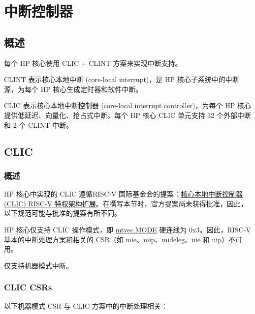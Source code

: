 \documentclass[main\_\_CN.tex]{subfiles}
\begin{document}
\newpage
\section{中断控制器}
\label{sec:riscvcpu-int-ctrl}


\subsection{概述}
\label{sec:riscvcpu-intr-overview}

每个 HP 核心使用 CLIC + CLINT 方案来实现中断支持。

CLINT 表示核心本地中断 (core-local interrupt)，是 HP 核心子系统中的中断源，为每个 HP 核心生成定时器和软件中断。

CLIC 表示核心本地中断控制器 (core-local interrupt controller)，为每个 HP 核心提供低延迟、向量化、抢占式中断。每个 HP 核心 CLIC 单元支持 32 个外部中断和 2 个 CLINT 中断。


\subsection{CLIC}
\label{sec:riscvcpu-clic}

\subsubsection{概述}
\label{sec:riscvcpu-clic-overview}


HP 核心中实现的 CLIC 遵循RISC-V 国际基金会的提案：\href{https://github.com/riscv/riscv-fast-interrupt/blob/26d29ce6ab7f1def8e5dc0a41639a1d8f67ea339/clic.adoc}{核心本地中断控制器 (CLIC) RISC-V 特权架构扩展}。在撰写本节时，官方提案尚未获得批准，因此，以下规范可能与批准的提案有所不同。

HP 核心仅支持 CLIC 操作模式，即 \hyperref[fielddesc:MTVECMODE]{mtvec.MODE} 硬连线为 0x3。因此，RISC-V 基本的中断处理方案和相关的 CSR（如 mie、mip、mideleg、uie 和 uip）不可用。

仅支持机器模式中断。

\subsubsection{CLIC CSRs}
\label{sec:riscvcpu-clic-csrs}

以下机器模式 CSR 与 CLIC 方案中的中断处理相关：
\end{document}
